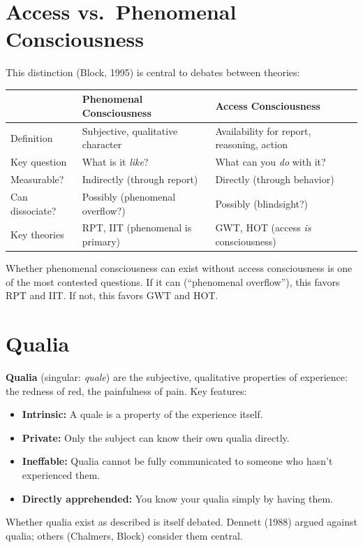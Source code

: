 \documentclass[11pt,a4paper]{report}
\begin{document}
\section{Access vs.\ Phenomenal Consciousness}

This distinction (Block, 1995) is central to debates between theories:

\begin{center}
\renewcommand{\arraystretch}{1.4}
\begin{tabular}{>{\raggedright}p{3.5cm} >{\raggedright}p{5cm} >{\raggedright\arraybackslash}p{5cm}}
  \toprule
  & \textbf{Phenomenal Consciousness} & \textbf{Access Consciousness} \\
  \midrule
  Definition & Subjective, qualitative character & Availability for report, reasoning, action \\
  Key question & What is it \emph{like}? & What can you \emph{do} with it? \\
  Measurable? & Indirectly (through report) & Directly (through behavior) \\
  Can dissociate? & Possibly (phenomenal overflow?) & Possibly (blindsight?) \\
  Key theories & RPT, IIT (phenomenal is primary) & GWT, HOT (access \emph{is} consciousness) \\
  \bottomrule
\end{tabular}
\end{center}

Whether phenomenal consciousness can exist without access consciousness is one of the most contested questions. If it can (``phenomenal overflow''), this favors RPT and IIT. If not, this favors GWT and HOT.

\section{Qualia}

\begin{definitionbox}[Qualia]
\textbf{Qualia} (singular: \emph{quale}) are the subjective, qualitative properties of experience: the redness of red, the painfulness of pain. Key features:
\begin{itemize}[leftmargin=1.5em]
  \item \textbf{Intrinsic:} A quale is a property of the experience itself.
  \item \textbf{Private:} Only the subject can know their own qualia directly.
  \item \textbf{Ineffable:} Qualia cannot be fully communicated to someone who hasn't experienced them.
  \item \textbf{Directly apprehended:} You know your qualia simply by having them.
\end{itemize}
Whether qualia exist as described is itself debated. Dennett (1988) argued against qualia; others (Chalmers, Block) consider them central.
\end{definitionbox}
\end{document}
